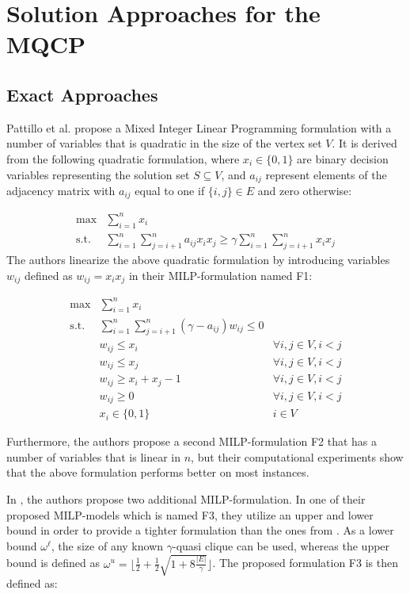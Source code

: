 \documentclass[draft,final]{vutinfth} %
\begin{document}
\section{Solution Approaches for the MQCP}\label{sec:mqcp-related-work}

\subsection{Exact Approaches}\label{milp-mqcp}
Pattillo et al. \cite{pattillo_maximum_2013} propose a Mixed Integer Linear Programming formulation with a number of variables that is quadratic in the size of the vertex set $V$. 
It is derived from the following quadratic formulation, where $x_i \in \{0,1\}$ are binary decision variables representing the solution set $S \subseteq V$, and $a_{ij}$ represent elements of the adjacency matrix with $a_{ij}$ equal to one if $\{i,j\} \in E$ and zero otherwise: 

\begin{align}
    \max & \sum_{i=1}^{n} x_i  \\
    \text{s.t. } & \sum_{i=1}^n \sum_{j=i+1}^n a_{ij} x_i x_j \geq \gamma \sum_{i=1}^n \sum_{j=i+1}^n x_i x_j 
\end{align}
The authors linearize the above quadratic formulation by introducing variables $w_{ij}$ defined as $w_{ij} = x_i x_j$ in their MILP-formulation named F1: 

\begin{align}
    \max & \sum_{i=1}^n x_i &\\
    \text{s.t. } & \sum_{i=1}^n \sum_{j=i+1}^n (\gamma - a_{ij}) w_{ij} \leq 0  &\\
     & w_{ij} \leq x_i & \forall i, j \in V, i < j\\
     & w_{ij} \leq x_j & \forall i, j \in V, i < j\\
     & w_{ij} \geq x_i + x_j - 1 & \forall i, j \in V, i < j\\
    & w_{ij} \geq 0 & \forall i, j \in V, i < j \\
    & x_i \in \{0,1\} & i \in V
\end{align}

Furthermore, the authors propose a second MILP-formulation F2 that has a number of variables that is linear in $n$, but their computational experiments show that the above formulation performs better on most instances. 

In \cite{VeremyevPBP16}, the authors propose two additional MILP-formulation. 
In one of their proposed MILP-models which is named F3, they utilize an upper and lower bound in order to provide a tighter formulation than the ones from \cite{pattillo_maximum_2013}. As a lower bound $\omega^{\ell}$, the size of any known $\gamma$-quasi clique can be used, whereas the upper bound is defined as  $\omega^u = \lfloor \frac{1}{2} + \frac{1}{2} \sqrt{1 + 8\frac{|E|}{\gamma}} \rfloor$. The proposed formulation F3 is then defined as: 
\end{document}
